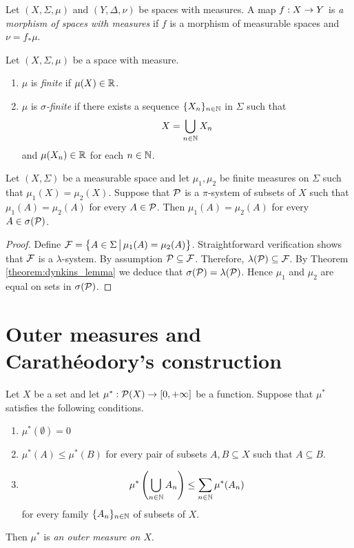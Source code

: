\begin{definition}
    Let $(X,\Sigma,\mu)$ and $(Y,\Delta,\nu)$ be spaces with measures. A map $f:X\rightarrow Y$ is \textit{a morphism of spaces with measures} if $f$ is a morphism of measurable spaces and $\nu = f_*\mu$.
\end{definition}

\begin{definition}
    Let $(X,\Sigma,\mu)$ be a space with measure.
    \begin{enumerate}[label=\textbf{(\arabic*)}, leftmargin=*]
        \item $\mu$ is \textit{finite} if $\mu(X) \in {\mathbb R}$.
        \item $\mu$ is \textit{$\sigma$-finite} if there exists a sequence $\{X_n\}_{n\in {\mathbb N}}$ in $\Sigma$ such that
              $$X = \bigcup_{n\in {\mathbb N}}X_n$$
              and $\mu(X_n)\in {\mathbb R}$ for each $n\in {\mathbb N}$.
    \end{enumerate}
\end{definition}

\begin{theorem}\label{theorem:uniqueness_on_pi_system}
    Let $(X,\Sigma)$ be a measurable space and let $\mu_1,\mu_2$ be finite measures on $\Sigma$ such that $\mu_1(X)=\mu_2(X)$. Suppose that ${\mathcal P}$ is a $\pi$-system of subsets of $X$ such that $\mu_1(A)=\mu_2(A)$ for every $A\in {\mathcal P}$. Then $\mu_1(A) = \mu_2(A)$ for every $A\in \sigma({\mathcal P})$.
\end{theorem}
\begin{proof}
    Define ${\mathcal F} = \big\{A\in \Sigma\,\big|\,\mu_1(A)=\mu_2(A) \big\}$. Straightforward verification shows that ${\mathcal F}$ is a $\lambda$-system. By assumption ${\mathcal P} \subseteq {\mathcal F}$. Therefore, $\lambda({\mathcal P}) \subseteq {\mathcal F}$. By Theorem \ref{theorem:dynkins_lemma} we deduce that $\sigma({\mathcal P})=\lambda({\mathcal P})$. Hence $\mu_1$ and $\mu_2$ are equal on sets in $\sigma({\mathcal P})$.
\end{proof}



\section{Outer measures and Carath{\'e}odory's construction}

\begin{definition}
    Let $X$ be a set and let $\mu^*:{\mathcal P}(X)\rightarrow [0,+\infty]$ be a function. Suppose that $\mu^*$ satisfies the following conditions.
    \begin{enumerate}[label=\textbf{(\arabic*)}, leftmargin=*]
        \item $\mu^*(\emptyset) = 0$
        \item $\mu^*(A) \leq \mu^*(B)$ for every pair of subsets $A,B\subseteq X$ such that $A\subseteq B$.
        \item $$\mu^*\left( \bigcup_{n\in {\mathbb N}}A_n \right)\leq \sum_{n\in {\mathbb N}}\mu^*(A_n)$$
              for every family  $\{A_n\}_{n\in {\mathbb N}}$ of subsets of $X$.
    \end{enumerate}
    Then $\mu^*$ is \textit{an outer measure on $X$}.
\end{definition}

